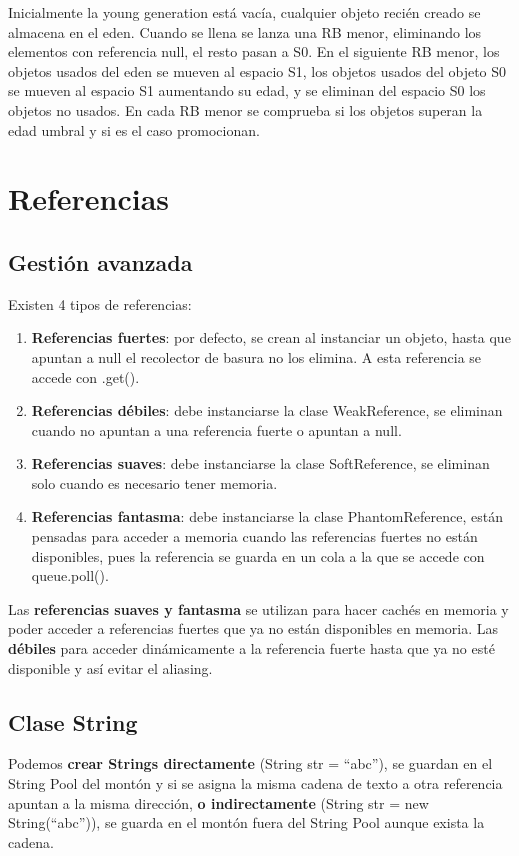 \documentclass{article}
\begin{document}
Inicialmente la young generation está vacía, cualquier objeto recién creado se almacena en el eden. Cuando se llena se lanza una RB menor, eliminando los elementos con referencia null, el resto pasan a S0. En el siguiente RB menor, los objetos usados del eden se mueven al espacio S1, los objetos usados del objeto S0 se mueven al espacio S1 aumentando su edad, y se eliminan del espacio S0 los objetos no usados. En cada RB menor se comprueba si los objetos superan la edad umbral y si es el caso promocionan.

\section{Referencias}

\subsection{Gestión avanzada}
Existen 4 tipos de referencias:
\begin{enumerate}
    \item \textbf{Referencias fuertes}: por defecto, se crean al instanciar un objeto, hasta que apuntan a null el recolector de basura no los elimina. A esta referencia se accede con .get().

    \item \textbf{Referencias débiles}: debe instanciarse la clase WeakReference, se eliminan cuando no apuntan a una referencia fuerte o apuntan a null.

    \item \textbf{Referencias suaves}: debe instanciarse la clase SoftReference, se eliminan solo cuando es necesario tener memoria.

    \item \textbf{Referencias fantasma}: debe instanciarse la clase PhantomReference, están pensadas para acceder a memoria cuando las referencias fuertes no están disponibles, pues la referencia se guarda en un cola a la que se accede con queue.poll().
\end{enumerate}

Las \textbf{referencias suaves y fantasma} se utilizan para hacer cachés en memoria y poder acceder a referencias fuertes que ya no están disponibles en memoria. Las \textbf{débiles} para acceder dinámicamente a la referencia fuerte hasta que ya no esté disponible y así evitar el aliasing.

\newpage

\subsection{Clase String}
Podemos \textbf{crear Strings directamente} (String str = “abc”), se guardan en el String Pool del montón y si se asigna la misma cadena de texto a otra referencia apuntan a la misma dirección, \textbf{o indirectamente} (String str = new String(“abc”)), se guarda en el montón fuera del String Pool aunque exista la cadena. \\
\end{document}
